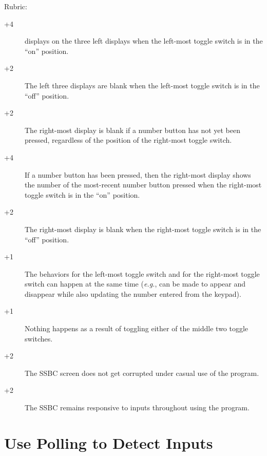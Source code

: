 \documentclass[12pt]{article}
\begin{document}
Rubric:
\begin{description}
    \item[\underline{\hspace{1cm}} +4] {} displays on the three
        left displays when the left-most toggle switch is in the ``on''
        position.
    \item[\underline{\hspace{1cm}} +2] The left three displays are blank when
        the left-most toggle switch is in the ``off'' position.
    \item[\underline{\hspace{1cm}} +2] The right-most display is blank if
        a number button has not yet been pressed, regardless of the position of
        the right-most toggle switch.
    \item [\underline{\hspace{1cm}} +4] If a number button has been pressed,
        then the right-most display shows the number of the most-recent number
        button pressed when the right-most toggle switch is in the ``on''
        position.
    \item[\underline{\hspace{1cm}} +2] The right-most display is blank when
        the right-most toggle switch is in the ``off'' position.
    \item[\underline{\hspace{1cm}} +1] The behaviors for the left-most toggle
        switch and for the right-most toggle switch can happen at the same time
        (\textit{e.g.}, {} can be made to appear and disappear
        while also updating the number entered from the keypad).
    \item[\underline{\hspace{1cm}} +1] Nothing happens as a result of toggling
        either of the middle two toggle switches.
    \item[\underline{\hspace{1cm}} +2] The SSBC screen does not get corrupted
        under casual use of the program.
    \item[\underline{\hspace{1cm}} +2] The SSBC remains responsive to inputs
        throughout using the program.
\end{description}

\section{Use Polling to Detect Inputs} \label{polling}
\end{document}
